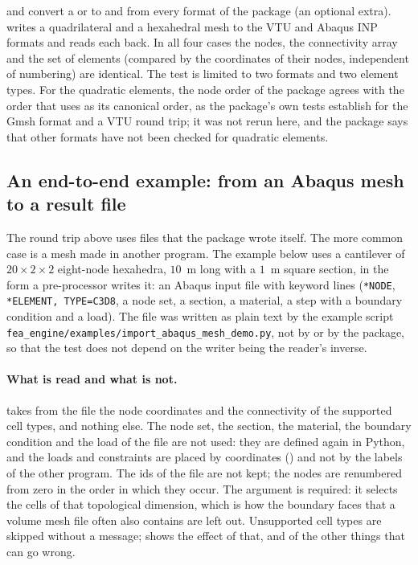 and  convert a  or  to and from every format of the  package (an optional extra).  writes a quadrilateral and a hexahedral mesh to the VTU and Abaqus INP formats and reads each back. In all four cases the nodes, the connectivity array and the set of elements (compared by the coordinates of their nodes, independent of numbering) are identical. The test is limited to two formats and two element types. For the quadratic elements, the node order of the package agrees with the order that  uses as its canonical order, as the package's own tests establish for the Gmsh format and a VTU round trip; it was not rerun here, and the package says that other formats have not been checked for quadratic elements.

\begin{table}[ht]
\centering\small

\caption{Round trip of a mesh through  and .}\label{tab:me-meshio}
\end{table}

\subsection{An end-to-end example: from an Abaqus mesh to a result file}\label{sec:me-example}

The round trip above uses files that the package wrote itself. The more common case is a mesh made in another program. The example below uses a cantilever of $20\times2\times2$ eight-node hexahedra, $10$~m long with a $1$~m square section, in the form a pre-processor writes it: an Abaqus input file with \cmiNsetLines{} keyword lines (\texttt{*NODE}, \texttt{*ELEMENT, TYPE=C3D8}, a node set, a section, a material, a step with a boundary condition and a load). The file was written as plain text by the example script \texttt{fea\_engine/examples/import\_abaqus\_mesh\_demo.py}, not by  or by the package, so that the test does not depend on the writer being the reader's inverse.

\paragraph{What is read and what is not.}  takes from the file the node coordinates and the connectivity of the supported cell types, and nothing else. The node set, the section, the material, the boundary condition and the load of the file are not used: they are defined again in Python, and the loads and constraints are placed by coordinates () and not by the labels of the other program. The ids of the file are not kept; the nodes are renumbered from zero in the order in which they occur. The argument  is required: it selects the cells of that topological dimension, which is how the boundary faces that a volume mesh file often also contains are left out. Unsupported cell types are skipped without a message;  shows the effect of that, and of the other things that can go wrong.


